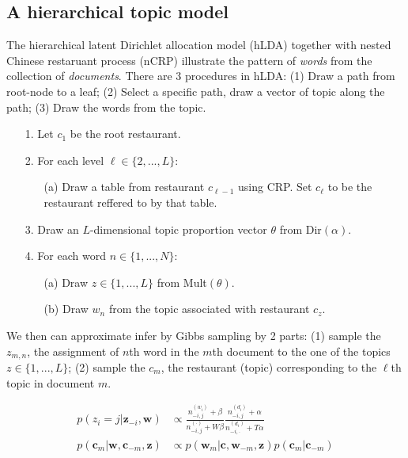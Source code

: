 \documentclass[a4paper]{article}
\begin{document}
\subsection{A hierarchical topic model}

The hierarchical latent Dirichlet allocation model (hLDA) together with nested Chinese restaruant process (nCRP) illustrate the pattern of {\it words} from the collection of {\it documents}. There are 3 procedures in hLDA: (1) Draw a path from root-node to a leaf; (2) Select a specific path, draw a vector of topic along the path; (3) Draw the words from the topic.

\begin{itemize}
\setlength{\itemsep}{0pt}
\setlength{\parsep}{0pt}
\setlength{\parskip}{0pt}
\item [1.] Let $c_{1}$ be the root restaurant.
\item [2.] For each level $\ell\in\{2,...,L\}$:
	\begin{itemize}
	\item [(a)] Draw a table from restaurant $c_{\ell-1}$ using CRP. Set $c_{\ell}$ to be the restaurant reffered to by that table.
	\end{itemize}
\item [3.] Draw an $L$-dimensional topic proportion vector $\theta$ from Dir$(\alpha)$.
\item [4.] For each word $n\in\{1,...,N\}$:
	\begin{itemize}
	\item [(a)] Draw $z\in\{1,...,L\}$ from Mult$(\theta)$.
	\item [(b)] Draw $w_{n}$ from the topic associated with restaurant $c_{z}$.
	\end{itemize}
\end{itemize}

We then can approximate infer by Gibbs sampling by 2 parts: (1) sample the $z_{m,n}$, the assignment of $n$th word in the $m$th document to the one of the topics $z\in\{1,...,L\}$\cite{Griffiths_Steyvers_2002}; (2) sample the $c_{m}$, the restaurant (topic) corresponding to the $\ell$th topic in document $m$.

\begin{align}
p(z_{i}=j|\mathbf{z}_{-i},\mathbf{w})&\propto\frac{n_{-i,j}^{(w_{i})}+\beta}{n_{-i,j}^{(\cdot)}+W\beta}\frac{n_{-i,j}^{(d_{i})}+\alpha}{n_{-i,\cdot}^{(d_{i})}+T\alpha}\\
p(\mathbf{c}_{m}|\mathbf{w},\mathbf{c}_{-m},\mathbf{z})&\propto p(\mathbf{w}_{m}|\mathbf{c},\mathbf{w}_{-m},\mathbf{z})p(\mathbf{c}_{m}|\mathbf{c}_{-m})
\end{align}


\newpage




\end{document}
